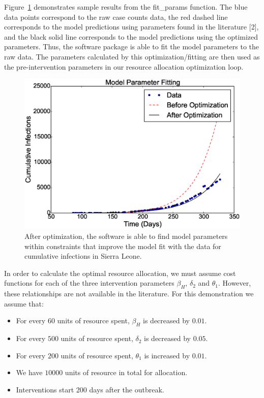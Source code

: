 \documentclass[11pt,letter]{article}
\begin{document}
Figure~\ref{model_fit} demonstrates sample results from the fit\_params function. The blue data points correspond to the raw case counts data, the red dashed line corresponds to the model predictions using parameters found in the literature [2], and the black solid line corresponds to the model predictions using the optimized parameters. Thus, the software package is able to fit the model parameters to the raw data. The parameters calculated by this optimization/fitting are then used as the pre-intervention parameters in our resource allocation optimization loop.\\
\begin{figure}
	\centering
	\includegraphics[width = 6.5 in]{model_fit.eps}
\caption{After optimization, the software is able to find model parameters within constraints that improve the model fit with the data for cumulative infections in Sierra Leone.
	\label{model_fit}}
\end{figure}

In order to calculate the optimal resource allocation, we must assume cost functions for each of the three intervention parameters $\beta_H$, $\delta_2$ and $\theta_1$. However, these relationships are not available in the literature. For this demonstration we assume that:
\begin{itemize}
\item For every $60$ units of resource spent, $\beta_H$ is decreased by $0.01$.
\item For every $500$ units of resource spent, $\delta_2$ is decreased by $0.05$.
\item For every $200$ units of resource spent, $\theta_1$ is increased by $0.01$.
\item We have $10000$ units of resource in total for allocation.
\item Interventions start 200 days after the outbreak.
\end{itemize}
\end{document}
